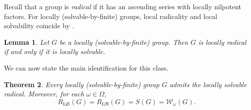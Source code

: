 \documentclass[11pt, reqno]{amsart}
\numberwithin{equation}{section}
\newtheorem{theorem}{Theorem}[section]
\newtheorem{lemma}[theorem]{Lemma}
\theoremstyle{definition}
\numberwithin{equation}{section}
\begin{document}
Recall that a group is \emph{radical} if it has an ascending series with  locally nilpotent factors. For locally (solvable-by-finite) groups, local radicality and local solvability coincide by \cite[Theorem~2.6]{CNH2025}.

\begin{lemma} \label{lem:locradislocsolonlocsolbyfinite} Let $G$ be a locally \textup{(}solvable-by-finite\textup{)} group. Then $G$ is locally radical if and only if it is locally solvable. 
\end{lemma} 

We can now state the main identification for this class. 

\begin{theorem} \label{theo:locally-finite} 
Every locally \textup{(}solvable-by-finite\textup{)} group $G$ admits
the locally solvable radical.
Moreover, for each $\omega\in\Omega$,
  $$R_{\mathrm{L}\mathfrak{S}}(G)
  =
  R_{\mathrm{L}\mathfrak{R}}(G)
  =
  S(G)
  =
  \mathcal{W}_{\omega}(G).$$
\end{theorem}
\end{document}
